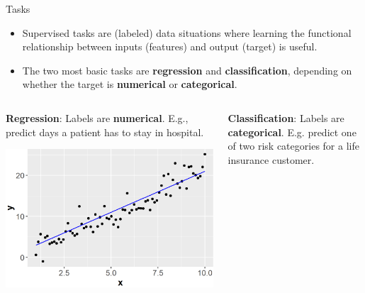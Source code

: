 \documentclass[11pt,compress,t,notes=noshow, xcolor=table]{beamer}
\begin{document}
\begin{vbframe}{Tasks}
\begin{itemize}
    \item Supervised tasks are (labeled) data situations where learning the functional
        relationship between inputs (features) and output (target) is
        useful.
    
    \item The two most basic tasks are 
        \textbf{regression} and \textbf{classification}, depending on whether the 
        target is \textbf{numerical} or \textbf{categorical}. 
\end{itemize}  

\lz

\begin{columns}    
\begin{column}{0.4\textwidth} 
\small \textbf{Regression}: Labels are \textbf{numerical}. E.g., predict days a patient has to stay in hospital.

  \begin{center}
    \includegraphics[width=\textwidth]{figure/ml-basics-supervised-regression-task.png} 
  \end{center}
\end{column}    

\begin{column}{0.4\textwidth} 
\small \textbf{Classification}: Labels are \textbf{categorical}. E.g. predict one of two risk categories for a life insurance customer. 
  

\end{column}
\end{columns}
\end{vbframe}
\end{document}
